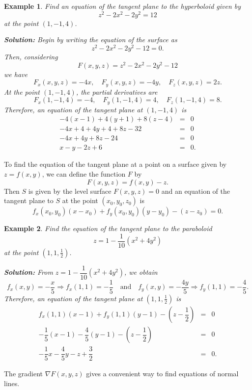 \documentclass[titlepage,a4paper,12pt]{report}
\newtheorem{example}{Example}[section]
\begin{document}
\begin{example}
Find an equation of the tangent plane to the hyperboloid given by 
\[z^2-2x^2-2y^2=12\] at the point $(1,-1,4)$.

\noindent \textbf{Solution:} Begin by writing the equation of the surface as 
\[z^2-2x^2-2y^2-12=0.\] Then, considering 
\[F(x,y,z)=z^2-2x^2-2y^2-12\] we have 
\[F_x(x,y,z)=-4x, \quad F_y(x,y,z)=-4y, \quad F_z(x,y,z)=2z.\] At the point $(1,-1,4)$, the partial derivatives are 
\[F_x(1,-1,4)=-4, \quad F_y(1,-1,4)=4, \quad F_z(1,-1,4)=8.\] Therefore, an equation of the tangent plane at $(1,-1,4)$ is 
\begin{eqnarray*}
-4(x-1) +4(y+1)+8(z-4) &=& 0\\
-4x+4+4y+4+8z-32 &=& 0\\
-4x+4y+8z-24 &=& 0\\
x-y-2z+6 &=& 0.
\end{eqnarray*}
\end{example}
\noindent To find the equation of the tangent plane at a point on a surface given by $z=f(x,y)$, we can define the function $F$ by 
\[F(x,y,z)=f(x,y)-z.\] Then $S$ is given by the level surface $F(x,y,z)=0$ and an equation of the tangent plane to $S$ at the point $(x_0,y_0,z_0)$ is 
\[f_x(x_0,y_0)(x-x_0)+f_y(x_0,y_0)(y-y_0)-(z-z_0)=0.\]
\begin{example}
Find the equation of the tangent plane to the paraboloid 
\[z=1-\dfrac{1}{10}(x^2+4y^2)\] at the point $(1,1,\frac{1}{2})$.

\noindent \textbf{Solution:} From $z=1-\dfrac{1}{10}(x^2+4y^2)$, we obtain 
\[f_x(x,y)=-\dfrac{x}{5}\Longrightarrow f_x(1,1)=-\dfrac{1}{5} \quad \mbox{and} \quad f_y(x,y)=-\dfrac{4y}{5}\Longrightarrow f_y(1,1)=-\dfrac{4}{5}.\]
Therefore, an equation of the tangent plane at $(1,1,\frac{1}{2})$ is 
\begin{eqnarray*}
f_x(1,1)(x-1)+f_y(1,1)(y-1)-\left(z-\dfrac{1}{2}\right) &=& 0\\
-\dfrac{1}{5}(x-1)-\dfrac{4}{5}(y-1)-\left(z-\dfrac{1}{2}\right) &=& 0 \\
-\dfrac{1}{5}x-\dfrac{4}{5}y-z+\dfrac{3}{2} &=& 0.
\end{eqnarray*}
\end{example}
\noindent The gradient $\nabla F(x,y,z)$ gives a convenient way to find equations of normal lines.
\end{document}
